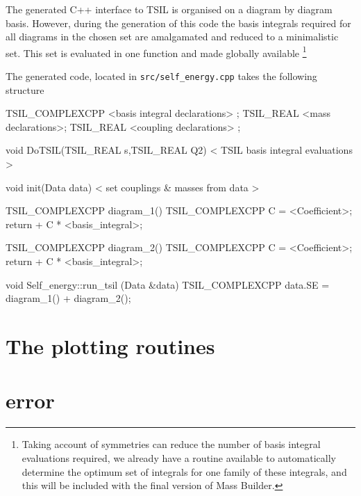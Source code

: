 The generated C++ interface to TSIL is organised on a diagram by diagram basis.  However, during the generation of this code the basis integrals required for all diagrams in the chosen set are amalgamated and reduced to a minimalistic set.  This set is evaluated in one function and made globally available \footnote{Taking account of symmetries can reduce the number of basis integral evaluations required, we already have a routine available to automatically determine the optimum set of integrals for one family of these integrals, and this will be included with the final version of Mass Builder.}

The generated code, located in \lstinline{src/self_energy.cpp} takes the following structure
\begin{lstcpp}
TSIL_COMPLEXCPP  <basis integral declarations> ;
TSIL_REAL  <mass declarations>;
TSIL_REAL  <coupling declarations> ;

void DoTSIL(TSIL_REAL s,TSIL_REAL Q2)
{
< TSIL basis integral evaluations >
}

void init(Data data) 
{
< set couplings & masses from data >
}

TSIL_COMPLEXCPP  diagram_1()
{
TSIL_COMPLEXCPP C =  <Coefficient>;
return  + C * <basis_integral>;
}

TSIL_COMPLEXCPP  diagram_2()
{
TSIL_COMPLEXCPP C =  <Coefficient>;
return  + C * <basis_integral>;
}

void Self_energy::run_tsil (Data &data) 
{
TSIL_COMPLEXCPP data.SE = diagram_1() + diagram_2();
}
\end{lstcpp}
\section{The plotting routines}



\section{error}\label{errors}



{}


  